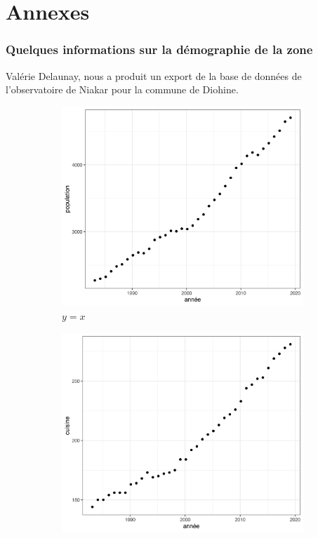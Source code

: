 \part*{Annexes}

\section{Quelques informations sur la démographie de la zone}

Valérie Delaunay, nous a produit un export de la base de données de l'observatoire de Niakar pour la commune de Diohine.

\begin{figure}
     \centering
     \begin{subfigure}[b]{0.45\textwidth}
         \centering
         \includegraphics[width=\textwidth]{img/population1995-2020_diohine.png}
         \caption{$y=x$}
         \label{fig:pop}
     \end{subfigure}
     \hfill
     \begin{subfigure}[b]{0.45\textwidth}
         \centering
         \includegraphics[width=\textwidth]{img/cuisine1995-2020_diohine.png}

\end{subfigure}
\end{figure}
